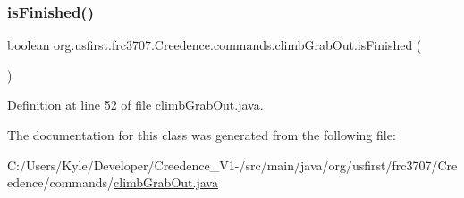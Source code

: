 \subsubsection{\texorpdfstring{isFinished()}{isFinished()}}
{\footnotesize\ttfamily boolean org.\+usfirst.\+frc3707.\+Creedence.\+commands.\+climb\+Grab\+Out.\+is\+Finished (\begin{DoxyParamCaption}{ }\end{DoxyParamCaption})\hspace{0.3cm}{\ttfamily [protected]}}



Definition at line 52 of file climb\+Grab\+Out.\+java.



The documentation for this class was generated from the following file\+:\begin{DoxyCompactItemize}
\item 
C\+:/\+Users/\+Kyle/\+Developer/\+Creedence\+\_\+\+V1-\//src/main/java/org/usfirst/frc3707/\+Creedence/commands/\mbox{\hyperlink{climb_grab_out_8java}{climb\+Grab\+Out.\+java}}\end{DoxyCompactItemize}
